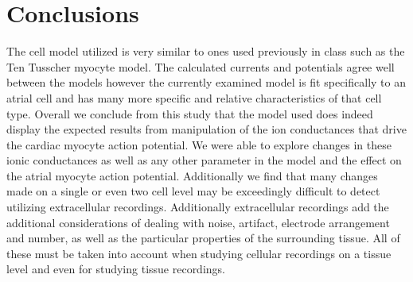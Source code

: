 \documentclass[12pt]{article}
\begin{document}
\section{Conclusions}
\par{}
The cell model utilized is very similar to ones used previously in class such as the Ten Tusscher myocyte model. \cite{TenTusscher2003} The calculated currents and potentials agree well between the models however the currently examined model is fit specifically to an atrial cell and has many more specific and relative characteristics of that cell type. Overall we conclude from this study that the model used does indeed display the expected results from manipulation of the ion conductances that drive the cardiac myocyte action potential. We were able to explore changes in these ionic conductances as well as any other parameter in the model and the effect on the atrial myocyte action potential. Additionally we find that many changes made on a single or even two cell level may be exceedingly difficult to detect utilizing extracellular recordings. Additionally extracellular recordings add the additional considerations of dealing with noise, artifact, electrode arrangement and number, as well as the particular properties of the surrounding tissue. All of these must be taken into account when studying cellular recordings on a tissue level and even for studying tissue recordings.
\end{document}
